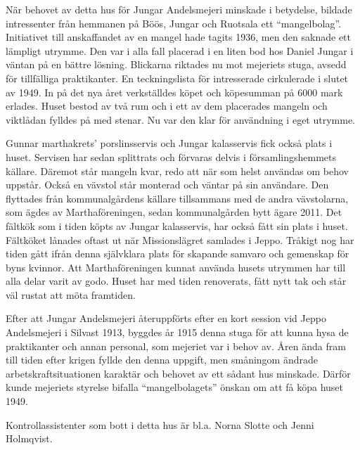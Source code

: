 
När behovet av detta hus för Jungar Andelsmejeri minskade i betydelse, bildade intressenter från hemmanen på Böös, Jungar och Ruotsala ett ``mangelbolag''. Initiativet till anskaffandet av en mangel hade tagits 1936, men den saknade ett lämpligt utrymme. Den var i alla fall placerad i en liten bod hos Daniel Jungar i väntan på en bättre lösning. Blickarna riktades nu mot mejeriets stuga, avsedd för tillfälliga praktikanter. En teckningslista för intresserade cirkulerade i slutet av 1949. In på det nya året verkställdes köpet och köpesumman på 6000 mark erlades. Huset bestod av två rum och i ett av dem placerades mangeln och viktlådan fylldes på med stenar. Nu var den klar för användning i eget utrymme.


Gunnar marthakrets' porslinsservis och Jungar kalasservis fick också plats i huset. Servisen har sedan splittrats och förvaras delvis i församlingshemmets källare. Däremot står mangeln kvar, redo att när som helst användas om behov uppstår. Också en vävstol står monterad och väntar på sin användare. Den flyttades från kommunalgårdens källare tillsammans med de andra vävstolarna, som ägdes av Marthaföreningen, sedan kommunalgården bytt ägare 2011. Det fältkök som i tiden köpts av Jungar kalasservis, har också fått sin plats i huset. Fältköket lånades oftast ut när Missionslägret samlades i Jeppo. Tråkigt nog har tiden gått ifrån denna självklara plats för skapande samvaro och gemenskap för byns kvinnor. Att Marthaföreningen kunnat använda husets utrymmen har till alla delar varit av godo. Huset har med tiden renoverats, fått nytt tak och står väl rustat att möta framtiden.


Efter att Jungar Andelsmejeri återuppförts efter en kort session vid Jeppo Andelsmejeri i Silvast 1913, byggdes år 1915 denna stuga för att kunna hysa de praktikanter och annan personal, som mejeriet var i behov av. Åren ända fram till tiden efter krigen fyllde den denna uppgift, men småningom ändrade arbetskraftsituationen karaktär och behovet av ett sådant hus minskade. Därför kunde mejeriets styrelse bifalla ``mangelbolagets'' önskan om att få köpa huset 1949.

Kontrollassistenter som bott i detta hus är bl.a. Norna Slotte och Jenni Holmqvist.



